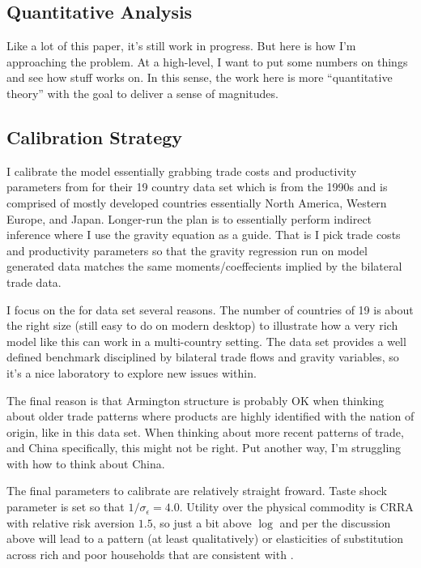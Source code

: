 \documentclass[12pt,pdftex]{article}
\begin{document}
\begin{onehalfspacing}
\section{Quantitative Analysis}

Like a lot of this paper, it's still work in progress. But here is how I'm approaching the problem. At a high-level, I want to put some numbers on things and see how stuff works on. In this sense, the work here is more ``quantitative theory'' with the goal to deliver a sense of magnitudes.

\subsection{Calibration Strategy}

I calibrate the model essentially grabbing trade costs and productivity parameters from \citet{eaton2002technology} for their 19 country data set which is from the 1990s and is comprised of mostly developed countries essentially North America, Western Europe, and Japan. Longer-run the plan is to essentially perform indirect inference where I use the gravity equation as a guide. That is I pick trade costs and productivity parameters so that the gravity regression run on model generated data matches the same moments/coeffecients implied by the bilateral trade data.

I focus on the \citet{eaton2002technology} for data set several reasons. The number of countries of 19 is about the right size (still easy to do on modern desktop) to illustrate how a very rich model like this can work in a multi-country setting. The \citet{eaton2002technology} data set provides a well defined benchmark disciplined by bilateral trade flows and gravity variables, so it's a nice laboratory to explore new issues within.

The final reason is that Armington structure is probably OK when thinking about older trade patterns where products are highly identified with the nation of origin, like in this data set. When thinking about more recent patterns of trade, and China specifically, this might not be right. Put another way, I'm struggling with how to think about China.

The final parameters to calibrate are relatively straight froward. Taste shock parameter is set so that $1 / \sigma_{\epsilon} = 4.0$. Utility over the physical commodity is CRRA with relative risk aversion $1.5$, so just a bit above $\log$ and per the discussion above will lead to a pattern (at least qualitatively) or elasticities of substitution across rich and poor households that are consistent with \citet*{auer2022unequal}.


\end{onehalfspacing}
\end{document}
